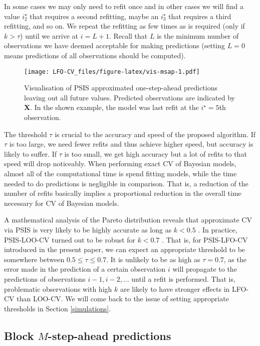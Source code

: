 \documentclass[american,]{article}
\begin{document}
In some cases we may only need to refit once and in other cases we will find a
value \(i^\star_2\) that requires a second refitting, maybe an \(i^\star_3\) that
requires a third refitting, and so on. We repeat the refitting as few times as
is required (only if \(k > \tau\)) until we arrive at \(i = L + 1\). Recall that \(L\)
is the minimum number of observations we have deemed acceptable for making
predictions (setting \(L=0\) means predictions of all observations should be
computed).

\begin{figure}
\centering
\texttt{[image: LFO-CV\_files/figure-latex/vis-msap-1.pdf]}
\caption{\label{fig:vis-msap}Visualisation of PSIS approximated one-step-ahead predictions leaving out all future values. Predicted observations are indicated by \textbf{X}. In the shown example, the model was last refit at the \(i^\star = 5\)th observation.}
\end{figure}

The threshold \(\tau\) is crucial to the accuracy and speed of the proposed
algorithm. If \(\tau\) is too large, we need fewer refits and thus achieve higher
speed, but accuracy is likely to suffer. If \(\tau\) is too small, we get high
accuracy but a lot of refits to that speed will drop noticeably. When performing
exact CV of Bayesian models, almost all of the computational time is spend
fitting models, while the time needed to do predictions is negligible in
comparison. That is, a reduction of the number of refits basically implies a
proportional reduction in the overall time necessary for CV of Bayesian models.

A mathematical analysis of the Pareto distribution reveals that approximate CV
via PSIS is very likely to be highly accurate as long as \(k < 0.5\)
\citep{vehtari2017psis}. In practice, PSIS-LOO-CV turned out to be robust for
\(k < 0.7\) \citep{vehtari2017loo}. That is, for PSIS-LFO-CV introduced in the
present paper, we can expect an appropriate threshold to be somewhere between
\(0.5 \leq \tau \leq 0.7\). It is unlikely to be as high as \(\tau = 0.7\), as the
error made in the prediction of a certain observation \(i\) will propagate to the
predictions of observations \(i-1, i-2, \ldots\) until a refit is performed. That
is, problematic observations with high \(k\) are likely to have stronger effects
in LFO-CV than LOO-CV. We will come back to the issue of setting appropriate
thresholds in Section \ref{simulations}.

\hypertarget{approximate_blockMSAP}{%
\subsection{\texorpdfstring{Block \(M\)-step-ahead predictions}{Block M-step-ahead predictions}}\label{approximate_blockMSAP}}
\end{document}
